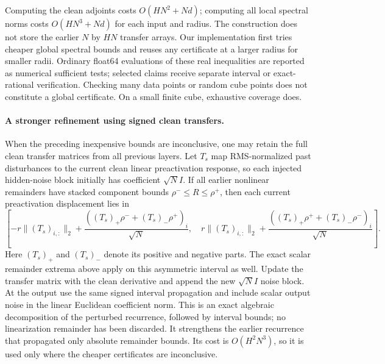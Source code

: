 Computing the clean adjoints costs $O(HN^2+Nd)$; computing all local
spectral norms costs $O(HN^3+Nd)$ for each input and radius. The construction
does not store the earlier $N$ by $HN$ transfer arrays. Our implementation
first tries cheaper global spectral bounds and reuses any certificate at
a larger radius for smaller radii. Ordinary float64 evaluations of these
real inequalities are reported as numerical sufficient tests; selected
claims receive separate interval or exact-rational verification. Checking
many data points or random cube points does not constitute a global
certificate. On a small finite cube, exhaustive coverage does.

\paragraph{A stronger refinement using signed clean transfers.}
When the preceding inexpensive bounds are inconclusive, one may retain
the full clean transfer matrices from all previous layers. Let $T_s$ map
RMS-normalized past disturbances to the current clean linear
preactivation response, so each injected hidden-noise block initially has
coefficient $\sqrt N I$. If all earlier nonlinear remainders have stacked
component bounds $\rho^-\le R\le\rho^+$, then each current preactivation
displacement lies in
\[
 \left[-r\|(T_s)_{i,:}\|_2+
  \frac{((T_s)_+\rho^-+(T_s)_-\rho^+)_i}{\sqrt N},\quad
  r\|(T_s)_{i,:}\|_2+
  \frac{((T_s)_+\rho^++(T_s)_-\rho^-)_i}{\sqrt N}\right].
\]
Here $(T_s)_+$ and $(T_s)_-$ denote its positive and negative parts.
The exact scalar remainder extrema above apply on this asymmetric
interval as well. Update the transfer matrix with the clean derivative
and append the new $\sqrt N I$ noise block. At the output use the same
signed interval propagation and include scalar output noise in the linear
Euclidean coefficient norm. This is an exact algebraic decomposition of
the perturbed recurrence, followed by interval bounds; no linearization
remainder has been discarded. It strengthens the earlier recurrence that
propagated only absolute remainder bounds. Its cost is $O(H^2N^3)$, so it
is used only where the cheaper certificates are inconclusive.

